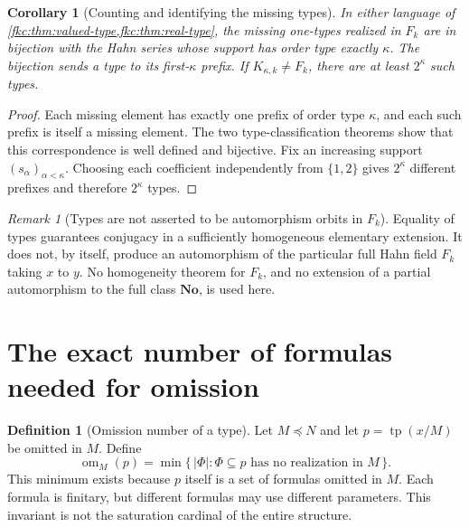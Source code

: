 \documentclass[11pt,letterpaper]{article}
\numberwithin{equation}{section}
\newtheorem{corollary}[theorem]{Corollary}
\theoremstyle{definition}
\newtheorem{definition}[theorem]{Definition}
\theoremstyle{remark}
\newtheorem{remark}[theorem]{Remark}
\newcommand{\No}{\mathbf{No}}
\newcommand{\tp}{\operatorname{tp}}
\newcommand{\om}{\operatorname{om}}
\begin{document}
\begin{corollary}[Counting and identifying the missing types]\label{fkc:cor:count}
In either language of \cref{fkc:thm:valued-type,fkc:thm:real-type}, the missing one-types realized in $F_k$ are in bijection with the Hahn series whose support has order type exactly $\kappa$. The bijection sends a type to its first-$\kappa$ prefix. If $K_{\kappa,k}\ne F_k$, there are at least $2^\kappa$ such types.
\end{corollary}
\begin{proof}
Each missing element has exactly one prefix of order type $\kappa$, and each such prefix is itself a missing element. The two type-classification theorems show that this correspondence is well defined and bijective. Fix an increasing support $(s_\alpha)_{\alpha<\kappa}$. Choosing each coefficient independently from $\{1,2\}$ gives $2^\kappa$ different prefixes and therefore $2^\kappa$ types.
\end{proof}

\begin{remark}[Types are not asserted to be automorphism orbits in $F_k$]
Equality of types guarantees conjugacy in a sufficiently homogeneous elementary extension. It does not, by itself, produce an automorphism of the particular full Hahn field $F_k$ taking $x$ to $y$. No homogeneity theorem for $F_k$, and no extension of a partial automorphism to the full class $\No$, is used here.
\end{remark}

\section{The exact number of formulas needed for omission}
\label{fkc:sec:omission}

\begin{definition}[Omission number of a type]
Let $M\preccurlyeq N$ and let $p=\tp(x/M)$ be omitted in $M$. Define
\begin{equation}\label{fkc:eq:omdef}
 \om_M(p)=\min\{\,|\Phi|:\Phi\subseteq p
                  \text{ has no realization in }M\,\}.
\end{equation}
This minimum exists because $p$ itself is a set of formulas omitted in $M$. Each formula is finitary, but different formulas may use different parameters. This invariant is not the saturation cardinal of the entire structure.
\end{definition}
\end{document}
